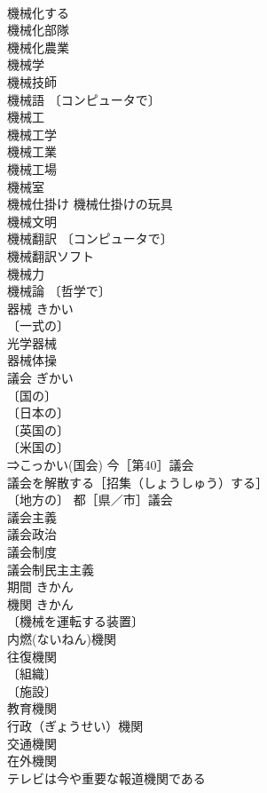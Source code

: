\documentclass[8pt]{extreport}
\begin{document}
\begin{CJK}{UTF8}{min}
\\	機械化する 
\\	機械化部隊 
\\	機械化農業 
\\	機械学 
\\	機械技師 
\\	機械語 〔コンピュータで〕
\\	機械工 
\\	機械工学 
\\	機械工業 
\\	機械工場 
\\	機械室 
\\	機械仕掛け 機械仕掛けの玩具 
\\	機械文明 
\\	機械翻訳 〔コンピュータで〕
\\	機械翻訳ソフト 
\\	機械力 
\\	機械論 〔哲学で〕
\\	器械	きかい	
\\	〔一式の〕
\\	光学器械 
\\	器械体操 
\\	議会	ぎかい	
\\	〔国の〕
\\	〔日本の〕
\\	〔英国の〕
\\	〔米国の〕
\\	⇒こっかい(国会) 今［第40］議会 
\\	議会を解散する［招集（しょうしゅう）する］ 
\\	〔地方の〕 都［県／市］議会 
\\	議会主義 
\\	議会政治 
\\	議会制度 
\\	議会制民主主義 
\\	期間	きかん	
\\	機関	きかん	
\\	〔機械を運転する装置〕
\\	内燃(ないねん)機関 
\\	往復機関 
\\	〔組織〕
\\	〔施設〕
\\	教育機関 
\\	行政（ぎょうせい）機関 
\\	交通機関 
\\	在外機関 
\\	テレビは今や重要な報道機関である 

\end{CJK}
\end{document}

